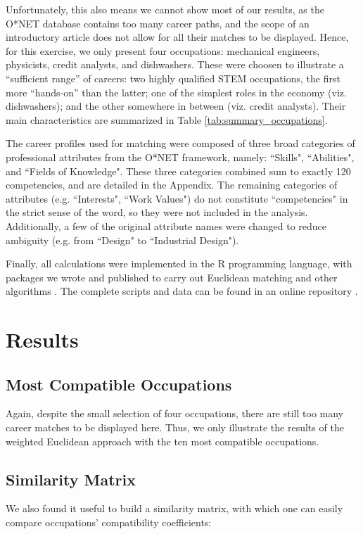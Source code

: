 \documentclass{article}
\begin{document}
Unfortunately, this also means we cannot show most of our results, as the O*NET
database contains too many career paths, and the scope of an introductory
article does not allow for all their matches to be displayed. Hence, for this
exercise, we only present four occupations: mechanical engineers, physicists,
credit analysts, and dishwashers. These were choosen to illustrate a
``sufficient range'' of careers: two highly qualified STEM occupations, the
first more ``hands-on'' than the latter; one of the simplest roles in the
economy (viz. dishwashers); and the other somewhere in between (viz. credit
analysts). Their main characteristics are summarized in Table
\ref{tab:summary_occupations}. \SummaryOccupations

The career profiles used for matching were composed of three broad categories
of professional attributes from the O*NET framework, namely: ``Skills",
``Abilities", and ``Fields of Knowledge". These three categories combined sum
to exactly 120 competencies, and are detailed in the Appendix. The remaining
categories of attributes (e.g. ``Interests", ``Work Values") do not constitute
``competencies" in the strict sense of the word, so they were not included in
the analysis. Additionally, a few of the original attribute names were changed
to reduce ambiguity (e.g. from ``Design" to ``Industrial Design").

Finally, all calculations were implemented in the R programming language, with
packages we wrote and published to carry out Euclidean matching and other
algorithms \parencite{atlas.match}. The complete scripts and data can be found in an online
repository \parencite{intro_career_matching}.

\section{Results}

\subsection{Most Compatible Occupations}
Again, despite the small selection of four occupations, there are still too
many career matches to be displayed here. Thus, we only illustrate the results
of the weighted Euclidean approach with the ten most compatible occupations.
\MatchesEngineers \MatchesPhysicists \MatchesCreditAnalysts \MatchesDishwashers

\subsection{Similarity Matrix}
We also found it useful to build a similarity matrix, with which one can easily
compare occupations' compatibility coefficients: \SimilarityMatrix
\end{document}
